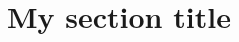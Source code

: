 \documentclass{article}
\begin{document}
\section{My section title}




























\end{document}
